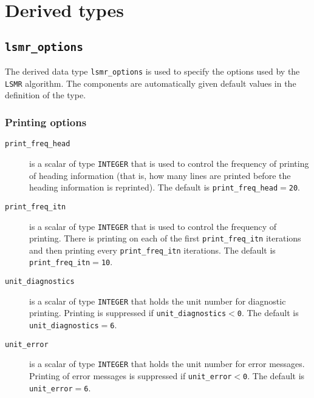 
\section{Derived types}
\subsection{\texttt{lsmr\_options}}
\label{LSMR:type:options}

The derived data type {\tt lsmr\_options} is used to specify the options used
by the \texttt{LSMR} algorithm. The components are automatically
given default values in the definition of the type.

\subsubsection*{Printing options}

\begin{description}

\item[\texttt{print\_freq\_head}] is a scalar of type  {\tt INTEGER}
that is used to control the frequency of printing 
of heading information (that is, how many
lines are printed before the heading information is reprinted). 
The default is {\tt print\_freq\_head$=$\tt 20}.

\item[\texttt{print\_freq\_itn}] is a scalar of type  {\tt INTEGER}
that is used to control the frequency of printing.
There is printing on each of the first {\tt print\_freq\_itn} iterations 
and then printing  every {\tt print\_freq\_itn}
iterations.
The default is {\tt print\_freq\_itn$=$\tt 10}.



\item[\texttt{unit\_diagnostics}] is a scalar  of type
{\tt INTEGER} that holds the
unit number for diagnostic printing. Printing is suppressed if
{\tt unit\_diagnostics$<$0}.
The default is {\tt unit\_diagnostics$=$6}.

\item[\texttt{unit\_error}] is a scalar of type  {\tt INTEGER} that holds the
unit number for error messages.
Printing of error messages
is suppressed if {\tt unit\_error$<$0}.
The default is {\tt unit\_error$=$6}.


\end{description}



